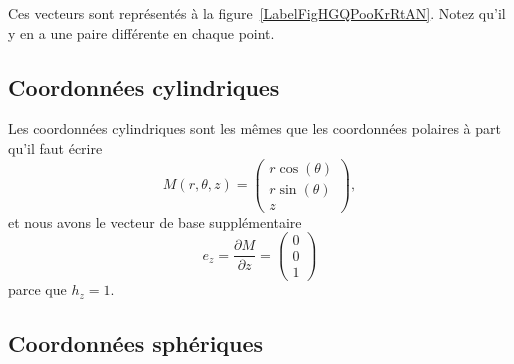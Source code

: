 Ces vecteurs sont représentés à la figure~\ref{LabelFigHGQPooKrRtAN}. Notez qu'il y en a une paire différente en chaque point.
\newcommand{\CaptionFigHGQPooKrRtAN}{En brun, les lignes que le point suivrait si on ne variait qu'une coordonnées polaires à la fois. Les vecteurs rouges sont les vecteurs $e_{r}$ et $e_{\theta}$.}


\subsection{Coordonnées cylindriques}

Les coordonnées cylindriques sont les mêmes que les coordonnées polaires à part qu'il faut écrire
\begin{equation}
	M(r,\theta,z)=\begin{pmatrix}
		r\cos(\theta) \\
		r\sin(\theta) \\
		z
	\end{pmatrix},
\end{equation}
et nous avons le vecteur de base supplémentaire
\begin{equation}
	e_z=\frac{ \partial M }{ \partial z }=\begin{pmatrix}
		0 \\
		0 \\
		1
	\end{pmatrix}
\end{equation}
parce que $h_z=1$.

\subsection{Coordonnées sphériques}

